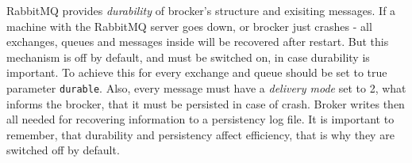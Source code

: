RabbitMQ provides \textit{durability}  of brocker's structure and exisiting messages.
If a machine with the RabbitMQ server goes down, or brocker just crashes - all exchanges, queues and messages inside will be recovered after restart.
But this mechanism is off by default, and must be switched on, in case durability is important.
To achieve this for every exchange and queue should be set to true parameter \lstinline{durable}.
Also, every message must have a \textit{delivery mode} set to 2, what informs the brocker, that it must be persisted in case of crash.
Broker writes then all needed for recovering information to a persistency log file.
It is important to remember, that durability and persistency affect efficiency, that is why they are switched off by default.